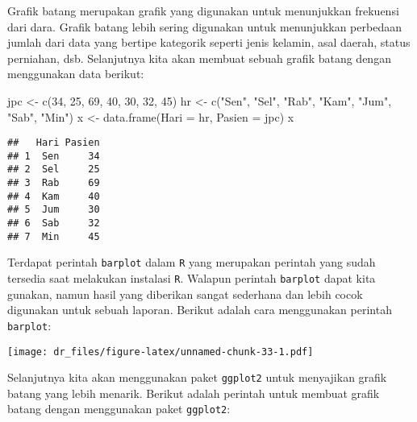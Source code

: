 \documentclass[
]{book}
\newenvironment{Shaded}{\begin{snugshade}}{\end{snugshade}}
\newcommand{\AttributeTok}[1]{\textcolor[rgb]{0.77,0.63,0.00}{#1}}
\newcommand{\DecValTok}[1]{\textcolor[rgb]{0.00,0.00,0.81}{#1}}
\newcommand{\FunctionTok}[1]{\textcolor[rgb]{0.00,0.00,0.00}{#1}}
\newcommand{\NormalTok}[1]{#1}
\newcommand{\OtherTok}[1]{\textcolor[rgb]{0.56,0.35,0.01}{#1}}
\newcommand{\SpecialCharTok}[1]{\textcolor[rgb]{0.00,0.00,0.00}{#1}}
\newcommand{\StringTok}[1]{\textcolor[rgb]{0.31,0.60,0.02}{#1}}
\begin{document}
Grafik batang merupakan grafik yang digunakan untuk menunjukkan frekuensi dari dara. Grafik batang lebih sering digunakan untuk menunjukkan perbedaan jumlah dari data yang bertipe kategorik seperti jenis kelamin, asal daerah, status perniahan, dsb. Selanjutnya kita akan membuat sebuah grafik batang dengan menggunakan data berikut:

\begin{Shaded}
\begin{Highlighting}[]
\NormalTok{jpc }\OtherTok{\textless{}{-}} \FunctionTok{c}\NormalTok{(}\DecValTok{34}\NormalTok{, }\DecValTok{25}\NormalTok{, }\DecValTok{69}\NormalTok{, }\DecValTok{40}\NormalTok{, }\DecValTok{30}\NormalTok{, }\DecValTok{32}\NormalTok{, }\DecValTok{45}\NormalTok{)}
\NormalTok{hr  }\OtherTok{\textless{}{-}} \FunctionTok{c}\NormalTok{(}\StringTok{"Sen"}\NormalTok{, }\StringTok{"Sel"}\NormalTok{, }\StringTok{"Rab"}\NormalTok{, }\StringTok{"Kam"}\NormalTok{, }\StringTok{"Jum"}\NormalTok{, }\StringTok{"Sab"}\NormalTok{, }\StringTok{"Min"}\NormalTok{)}
\NormalTok{x   }\OtherTok{\textless{}{-}} \FunctionTok{data.frame}\NormalTok{(}\AttributeTok{Hari =}\NormalTok{ hr, }\AttributeTok{Pasien =}\NormalTok{ jpc)}
\NormalTok{x}
\end{Highlighting}
\end{Shaded}

\begin{verbatim}
##   Hari Pasien
## 1  Sen     34
## 2  Sel     25
## 3  Rab     69
## 4  Kam     40
## 5  Jum     30
## 6  Sab     32
## 7  Min     45
\end{verbatim}

Terdapat perintah \texttt{barplot} dalam \texttt{R} yang merupakan perintah yang sudah tersedia saat melakukan instalasi \texttt{R}. Walapun perintah \texttt{barplot} dapat kita gunakan, namun hasil yang diberikan sangat sederhana dan lebih cocok digunakan untuk sebuah laporan. Berikut adalah cara menggunakan perintah \texttt{barplot}:

\begin{Shaded}
\end{Shaded}

\texttt{[image: dr\_files/figure-latex/unnamed-chunk-33-1.pdf]}

Selanjutnya kita akan menggunakan paket \texttt{ggplot2} untuk menyajikan grafik batang yang lebih menarik. Berikut adalah perintah untuk membuat grafik batang dengan menggunakan paket \texttt{ggplot2}:
\end{document}
